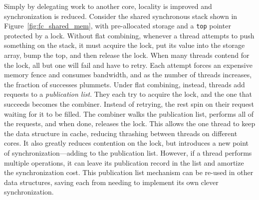 


Simply by delegating work to another core, locality is improved and synchronization is reduced.
Consider the shared synchronous stack shown in Figure~\ref{fig:fc_shared_mem}, with pre-allocated storage and a \texttt{top} pointer protected by a lock. Without flat combining, whenever a thread attempts to push something on the stack, it must acquire the lock, put its value into the storage array, bump the top, and then release the lock. When many threads contend for the lock, all but one will fail and have to retry. Each attempt forces an expensive memory fence and consumes bandwidth, and as the number of threads increases, the fraction of successes plummets. Under flat combining, instead, threads add requests to a \emph{publication list}. They each try to acquire the lock, and the one that succeeds becomes the combiner. Instead of retrying, the rest spin on their request waiting for it to be filled. The combiner walks the publication list, performs all of the requests, and when done, releases the lock. This allows the one thread to keep the data structure in cache, reducing thrashing between threads on different cores. It also greatly reduces contention on the lock, but introduces a new point of synchronization---adding to the publication list. However, if a thread performs multiple operations, it can leave its publication record in the list and amortize the synchronization cost. This publication list mechanism can be re-used in other data structures, saving each from needing to implement its own clever synchronization.

